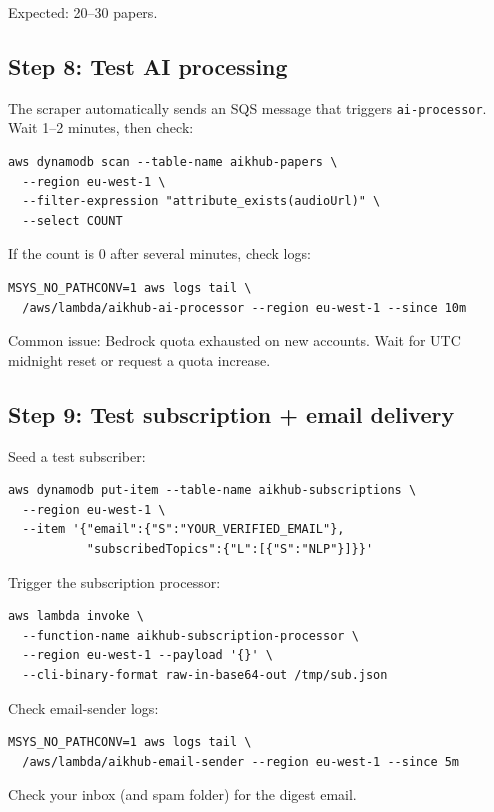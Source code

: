 \documentclass[11pt,a4paper]{article}
\begin{document}
Expected: 20--30 papers.

\subsection{Step 8: Test AI processing}

The scraper automatically sends an SQS message that triggers \texttt{ai-processor}. Wait 1--2 minutes, then check:
\begin{lstlisting}[basicstyle=\ttfamily\small]
aws dynamodb scan --table-name aikhub-papers \
  --region eu-west-1 \
  --filter-expression "attribute_exists(audioUrl)" \
  --select COUNT
\end{lstlisting}

If the count is 0 after several minutes, check logs:
\begin{lstlisting}[basicstyle=\ttfamily\small]
MSYS_NO_PATHCONV=1 aws logs tail \
  /aws/lambda/aikhub-ai-processor --region eu-west-1 --since 10m
\end{lstlisting}

Common issue: Bedrock quota exhausted on new accounts. Wait for UTC midnight reset or request a quota increase.

\subsection{Step 9: Test subscription + email delivery}

Seed a test subscriber:
\begin{lstlisting}[basicstyle=\ttfamily\small]
aws dynamodb put-item --table-name aikhub-subscriptions \
  --region eu-west-1 \
  --item '{"email":{"S":"YOUR_VERIFIED_EMAIL"},
           "subscribedTopics":{"L":[{"S":"NLP"}]}}'
\end{lstlisting}

Trigger the subscription processor:
\begin{lstlisting}[basicstyle=\ttfamily\small]
aws lambda invoke \
  --function-name aikhub-subscription-processor \
  --region eu-west-1 --payload '{}' \
  --cli-binary-format raw-in-base64-out /tmp/sub.json
\end{lstlisting}

Check email-sender logs:
\begin{lstlisting}[basicstyle=\ttfamily\small]
MSYS_NO_PATHCONV=1 aws logs tail \
  /aws/lambda/aikhub-email-sender --region eu-west-1 --since 5m
\end{lstlisting}

Check your inbox (and spam folder) for the digest email.
\end{document}
